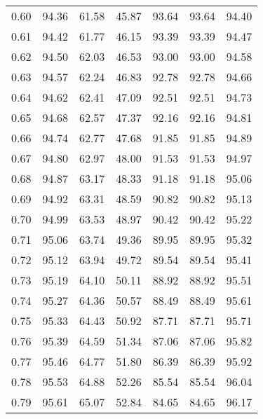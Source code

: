 \begin{tabular}{|c|c|c|c|c|c|c|}
      0.60 &     94.36 &     61.58 &      45.87 &   93.64 &      93.64 &         94.40 \\
      0.61 &     94.42 &     61.77 &      46.15 &   93.39 &      93.39 &         94.47 \\
      0.62 &     94.50 &     62.03 &      46.53 &   93.00 &      93.00 &         94.58 \\
      0.63 &     94.57 &     62.24 &      46.83 &   92.78 &      92.78 &         94.66 \\
      0.64 &     94.62 &     62.41 &      47.09 &   92.51 &      92.51 &         94.73 \\
      0.65 &     94.68 &     62.57 &      47.37 &   92.16 &      92.16 &         94.81 \\
      0.66 &     94.74 &     62.77 &      47.68 &   91.85 &      91.85 &         94.89 \\
      0.67 &     94.80 &     62.97 &      48.00 &   91.53 &      91.53 &         94.97 \\
      0.68 &     94.87 &     63.17 &      48.33 &   91.18 &      91.18 &         95.06 \\
      0.69 &     94.92 &     63.31 &      48.59 &   90.82 &      90.82 &         95.13 \\
      0.70 &     94.99 &     63.53 &      48.97 &   90.42 &      90.42 &         95.22 \\
      0.71 &     95.06 &     63.74 &      49.36 &   89.95 &      89.95 &         95.32 \\
      0.72 &     95.12 &     63.94 &      49.72 &   89.54 &      89.54 &         95.41 \\
      0.73 &     95.19 &     64.10 &      50.11 &   88.92 &      88.92 &         95.51 \\
      0.74 &     95.27 &     64.36 &      50.57 &   88.49 &      88.49 &         95.61 \\
      0.75 &     95.33 &     64.43 &      50.92 &   87.71 &      87.71 &         95.71 \\
      0.76 &     95.39 &     64.59 &      51.34 &   87.06 &      87.06 &         95.82 \\
      0.77 &     95.46 &     64.77 &      51.80 &   86.39 &      86.39 &         95.92 \\
      0.78 &     95.53 &     64.88 &      52.26 &   85.54 &      85.54 &         96.04 \\
      0.79 &     95.61 &     65.07 &      52.84 &   84.65 &      84.65 &         96.17 \\

\end{tabular}

